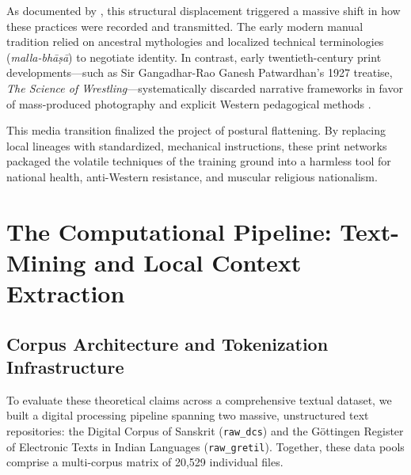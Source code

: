 \documentclass[11pt,twoside,letterpaper]{article}
\begin{document}
As documented by \citet{Thomas2025}, this structural displacement triggered a massive shift in how these practices were recorded and transmitted. The early modern manual tradition relied on ancestral mythologies and localized technical terminologies (\textit{malla-bhāṣā}) to negotiate identity. In contrast, early twentieth-century print developments—such as Sir Gangadhar-Rao Ganesh Patwardhan’s 1927 treatise, \textit{The Science of Wrestling}—systematically discarded narrative frameworks in favor of mass-produced photography and explicit Western pedagogical methods \citep{Thomas2025}. 

This media transition finalized the project of postural flattening. By replacing local lineages with standardized, mechanical instructions, these print networks packaged the volatile techniques of the training ground into a harmless tool for national health, anti-Western resistance, and muscular religious nationalism.


\section{The Computational Pipeline: Text-Mining and Local Context Extraction}

\subsection{Corpus Architecture and Tokenization Infrastructure}
To evaluate these theoretical claims across a comprehensive textual dataset, we built a digital processing pipeline spanning two massive, unstructured text repositories: the Digital Corpus of Sanskrit (\texttt{raw\_dcs}) and the Göttingen Register of Electronic Texts in Indian Languages (\texttt{raw\_gretil}). Together, these data pools comprise a multi-corpus matrix of 20,529 individual files.
\end{document}
